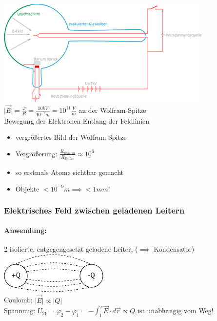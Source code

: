 \documentclass[11pt]{article}
\begin{document}
\includegraphics{skizzen/14/14_8B3}\\

$ \vert\vec{E}\vert = \frac{\varphi}{R}= \frac{10kV}{10^{-7}m} = 10^11\frac{V}{m} $ an der Wolfram-Spitze\\
Bewegung der Elektronen Entlang der Feldlinien\\
\begin{itemize}
	\item vergrößertes Bild der Wolfram-Spitze\\
	\item Vergrößerung: $\frac{R_{Schirm}}{R_{Spitze}}\approx \underline{10^6}$
	\item so erstmals Atome sichtbar gemacht
	\item Objekte $<10^{-9}m \implies <1mm!$
\end{itemize}

\subsubsection{Elektrisches Feld zwischen geladenen Leitern}

\paragraph{Anwendung:}2 isolierte, entgegengesetzt geladene Leiter, ($\implies$ Kondensator)
\hfill\\

\includegraphics{skizzen/14/14_8B4}\\

Coulomb: $\vert\vec{E}\vert\propto\vert Q\vert$\\
Spannung: $ U_{21}=\varphi_2-\varphi_1 = -\displaystyle\int_{1}^{2} \vec{E}\cdot d\vec{r}\propto Q $ ist unabhängig vom Weg!\\
\end{document}

